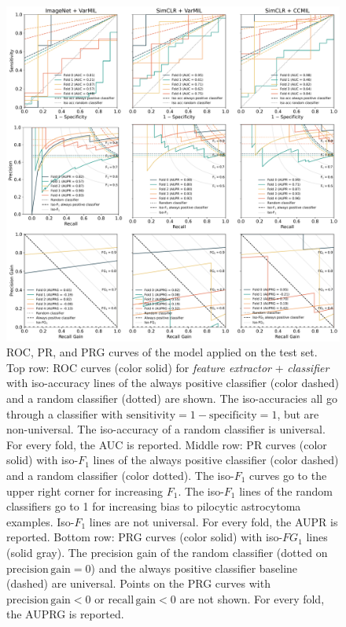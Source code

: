 \begin{figure}
    \centering
    \includegraphics[width=\linewidth]{pediatric-brain-tumours/images/all.pdf}
    \caption[ROC, PR, and PRG]{
        ROC, PR, and PRG curves of the model applied on the test set.
        Top row: ROC curves (color solid) for \emph{feature extractor} + \emph{classifier} with iso-accuracy lines of the always positive classifier (color dashed) and a random classifier (dotted) are shown.
        The iso-accuracies all go through a classifier with $\mathrm{sensitivity} = 1 - \textrm{specificity} = 1$, but are non-universal.
        The iso-accuracy of a random classifier is universal.
        For every fold, the AUC is reported.
        Middle row: PR curves (color solid) with iso-$F_1$ lines of the always positive classifier (color dashed) and a random classifier (color dotted).
        The iso-$F_1$ curves go to the upper right corner for increasing $F_1$.
        The iso-$F_1$ lines of the random classifiers go to 1 for increasing bias to pilocytic astrocytoma examples.
        Iso-$F_1$ lines are not universal.
        For every fold, the AUPR is reported.
        Bottom row: PRG curves (color solid) with iso-$FG_1$ lines (solid gray).
        The precision gain of the random classifier (dotted on $\mathrm{precision\,gain} = 0$) and the always positive classifier baseline (dashed) are universal.
        Points on the PRG curves with $\mathrm{precision\,gain} < 0$ or $\mathrm{recall\,gain} < 0$ are not shown.
        For every fold, the AUPRG is reported.
    }
    \label{fig:roc-pr-prg}
\end{figure}

